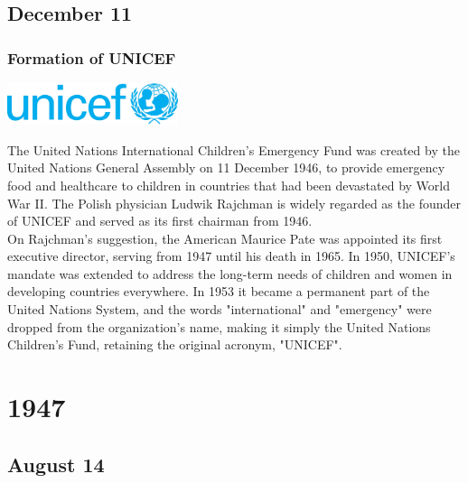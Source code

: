 \documentclass[11pt]{report}
\begin{document}
\section{December 11}
\subsection{Formation of UNICEF}
\vspace{2mm}\begin{center}\includegraphics[width=5cm]{./img/unicefLogo.jpg}\end{center}
The United Nations International Children's Emergency Fund was created by the United Nations General Assembly on 11 December 1946, to provide emergency food and healthcare to children in countries that had been devastated by World War II. The Polish physician Ludwik Rajchman is widely regarded as the founder of UNICEF and served as its first chairman from 1946.\\
On Rajchman's suggestion, the American Maurice Pate was appointed its first executive director, serving from 1947 until his death in 1965. In 1950, UNICEF's mandate was extended to address the long-term needs of children and women in developing countries everywhere. In 1953 it became a permanent part of the United Nations System, and the words "international" and "emergency" were dropped from the organization's name, making it simply the United Nations Children's Fund, retaining the original acronym, "UNICEF".

\chapter{1947}
\section{August 14}
\end{document}
